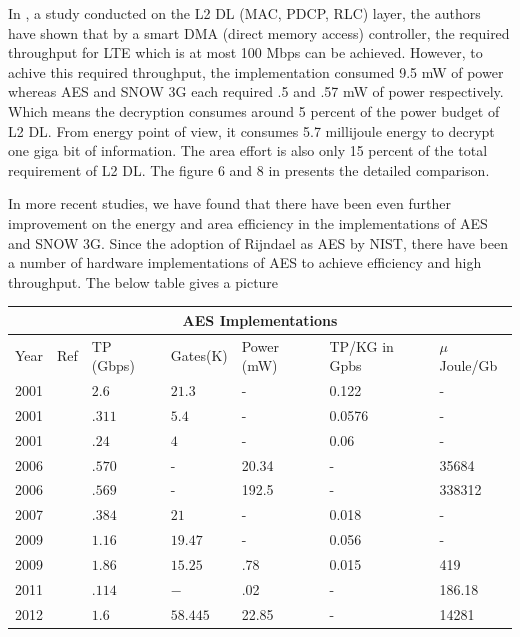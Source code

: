 In \cite{IIS_Ruhr_2010}, a study conducted on the L2 DL (MAC, PDCP, RLC) layer, the authors have shown that by a smart DMA (direct memory access) controller, the required throughput for LTE which is at most 100 Mbps can be achieved. However, to achive this required throughput, the implementation consumed 9.5 mW of power whereas AES and SNOW 3G each required .5 and .57 mW of power respectively. Which means the decryption consumes around 5 percent of the power budget of L2 DL. From energy point of view, it consumes 5.7 millijoule energy to decrypt one giga bit of information. The area effort is also only 15 percent of the total requirement of L2 DL. The figure 6 and 8 in \cite{IIS_Ruhr_2010} presents the detailed comparison. 

In more recent studies, we have found that there have been even further improvement on the energy and area efficiency in the implementations of AES and SNOW 3G. Since the adoption of Rijndael as AES by NIST, there have been a number of hardware implementations of AES to achieve efficiency and high throughput. The below table gives a picture \newline

\begin{tiny}
\noindent
\begin{tabular}{|p{}
				|p{}
				|p{}
				|p{}
				|p{}
				|p{}
				|p{}|
				}
\hline
\multicolumn{7}{|c|}{AES Implementations} \\
\hline
Year & Ref & TP (Gbps) & Gates(K) & Power (mW) & TP/KG in Gpbs & $\mu$Joule/Gb \\
\hline
2001 & \cite{IBM_Japan_2001} &$2.6$ &$21.3$  & - & 0.122 & - \\ \hline
2001 & \cite{IBM_Japan_2001} &$.311$ &$5.4$  & - & 0.0576 & - \\ \hline
2001 & \cite{IBM_India_IIT_2001} &$.24$ &$4$  & - & 0.06 & - \\ \hline
2006 & \cite{Taiwan_2006} &$.570$ & - &20.34 & - & 35684 \\ \hline
2006 & \cite{Taiwan_2006} &$.569$ & - &192.5 & - & 338312 \\ \hline
2007 & \cite{IIT_Kharagpur_2007} &$.384$ &$21$ &- & 0.018 & - \\ \hline
2009 & \cite{IME_China_Tsinghua_Univerisity_2009} &$1.16$ &$19.47$ & - & 0.056 & - \\ \hline
2009 & \cite{Ruhr_2009} &$1.86$ &$15.25$ &.78 & 0.015 & 419 \\ \hline
2011 & \cite{Ruhr_2011} &$.114$ &$ - $ &.02 & -  & 186.18 \\ \hline
2012 & \cite{Pune_2012} &$1.6$ &$58.445$ &22.85 & - & 14281 \\ \hline
\end{tabular}
\end{tiny}

